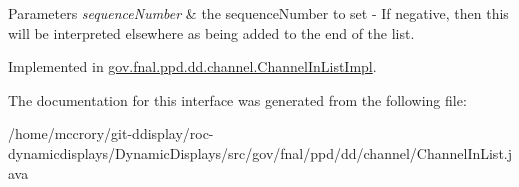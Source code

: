 \begin{DoxyParams}{Parameters}
{\em sequence\-Number} & the sequence\-Number to set -\/ If negative, then this will be interpreted elsewhere as being added to the end of the list. \\
\hline
\end{DoxyParams}


Implemented in \hyperlink{classgov_1_1fnal_1_1ppd_1_1dd_1_1channel_1_1ChannelInListImpl_a3d7875d359431d5e2dc13b60db55cf72}{gov.\-fnal.\-ppd.\-dd.\-channel.\-Channel\-In\-List\-Impl}.



The documentation for this interface was generated from the following file\-:\begin{DoxyCompactItemize}
\item 
/home/mccrory/git-\/ddisplay/roc-\/dynamicdisplays/\-Dynamic\-Displays/src/gov/fnal/ppd/dd/channel/Channel\-In\-List.\-java\end{DoxyCompactItemize}
